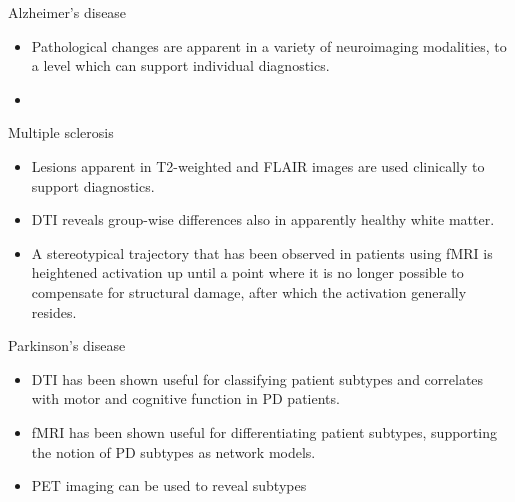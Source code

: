 \documentclass[10pt]{beamer}
\begin{document}
    \begin{frame}{Alzheimer's disease}
        \centering
        \begin{itemize}
            \item Pathological changes are apparent in a variety of neuroimaging modalities, to a level which can support individual diagnostics.
            \item
        \end{itemize}
    \end{frame}
    \begin{frame}{Multiple sclerosis}
        \begin{itemize}
            \item Lesions apparent in T2-weighted and FLAIR images are used clinically to support diagnostics.
            \item DTI reveals group-wise differences also in apparently healthy white matter.
            \item A stereotypical trajectory that has been observed in patients using fMRI is heightened activation up until a point where it is no longer possible to compensate for structural damage, after which the activation generally resides.
        \end{itemize}
    \end{frame}
    \begin{frame}{Parkinson's disease}
        \begin{itemize}
            \item DTI has been shown useful for classifying patient subtypes and correlates with motor and cognitive function in PD patients.
            \item fMRI has been shown useful for differentiating patient subtypes, supporting the notion of PD subtypes as network models.
            \item PET imaging can be used to reveal subtypes
        \end{itemize}
    \end{frame}
\end{document}
